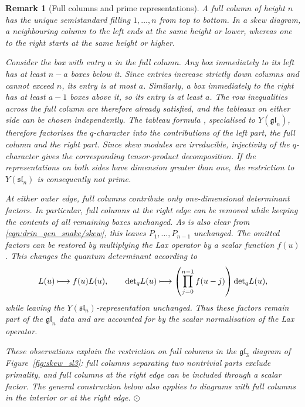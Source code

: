 \documentclass[12pt,reqno]{amsart}
\def\detq{{\rm det}_q}
\numberwithin{equation}{section}
\newtheorem{rem}[thm]{Remark}
\begin{document}
	\begin{rem}[Full columns and prime representations]
		\label{rem:full_columns}
		A full column of height $n$ has the unique semistandard filling
		$1,\ldots,n$ from top to bottom. In a skew diagram, a neighbouring
		column to the left ends at the same height or lower, whereas one
		to the right starts at the same height or higher.
		
		Consider the box with entry $a$ in the full column. Any box
		immediately to its left has at least $n-a$ boxes below it.
		Since entries increase strictly down columns and cannot exceed
		$n$, its entry is at most $a$. Similarly, a box immediately to
		the right has at least $a-1$ boxes above it, so its entry is at
		least $a$. The row inequalities across the full column are
		therefore already satisfied, and the tableaux on either side
		can be chosen independently. The tableau formula
		\cite[Theorem~3.4]{LuMukhin2021}, specialised to
		$Y(\mathfrak{gl}_n)$, therefore factorises the $q$-character into
		the contributions of the left part, the full column and the right
		part. Since skew modules are irreducible, injectivity of the
		$q$-character \cite[Lemma~2.8]{LuMukhin2021} gives the corresponding
		tensor-product decomposition. If the representations on both sides
		have dimension greater than one, the restriction to
		$Y(\mathfrak{sl}_n)$ is consequently not prime.
		
		At either outer edge, full columns contribute only one-dimensional
		determinant factors. In particular, full columns at the right edge
		can be removed while keeping the contents of all remaining boxes
		unchanged. As is also clear from \eqref{eqn:drin_gen_snake/skew},
		this leaves $P_1,\ldots,P_{n-1}$ unchanged. The omitted factors
		can be restored by multiplying the Lax operator by a scalar
		function $f(u)$. This changes the quantum determinant according to
		\begin{equation*}
			L(u)\longmapsto f(u)L(u),\qquad
			\detq L(u)\longmapsto
			\left(\prod_{j=0}^{n-1}f(u-j)\right)\detq L(u),
		\end{equation*}
		while leaving the $Y(\mathfrak{sl}_n)$-representation unchanged.
		Thus these factors remain part of the $\mathfrak{gl}_n$ data and
		are accounted for by the scalar normalisation of the Lax operator.
		
		These observations explain the restriction on full columns in
		the $\mathfrak{gl}_3$ diagram of Figure~\ref{fig:skew_sl3}:
		full columns separating two nontrivial parts exclude primality,
		and full columns at the
		right edge can be included through a scalar factor. The general
		construction below also applies to diagrams with full columns
		in the interior or at the right edge. $\odot$
	\end{rem}
	
\end{document}
